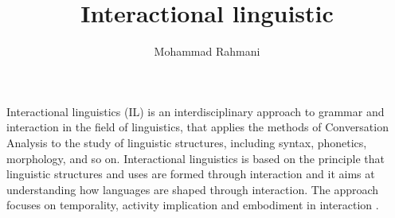 \documentclass[a4paper]{article}
\title{Interactional linguistic}
\date{}
\author{Mohammad Rahmani}
\begin{document}
\maketitle
    Interactional linguistics (IL) is an interdisciplinary approach to grammar and interaction in the field of linguistics, that applies the methods of Conversation Analysis to the study of linguistic structures, including syntax, phonetics, morphology, and so on. Interactional linguistics is based on the principle that linguistic structures and uses are formed through interaction and it aims at understanding how languages are shaped through interaction. The approach focuses on temporality, activity implication and embodiment in interaction .
%    
%    
\end{document}
